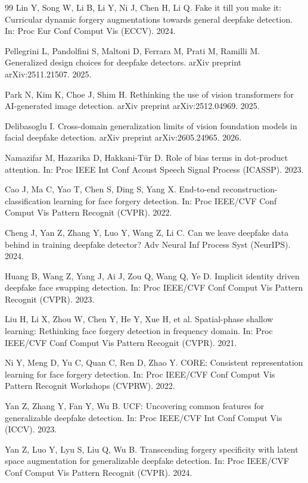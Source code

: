 \documentclass[fonts]{icst}
\begin{document}
\begin{thebibliography}{99}
Lin Y, Song W, Li B, Li Y, Ni J, Chen H, Li Q.
Fake it till you make it: Curricular dynamic forgery augmentations towards general deepfake detection.
In: Proc Eur Conf Comput Vis (ECCV). 2024.

Pellegrini L, Pandolfini S, Maltoni D, Ferrara M, Prati M, Ramilli M.
Generalized design choices for deepfake detectors.
arXiv preprint arXiv:2511.21507. 2025.

Park N, Kim K, Choe J, Shim H.
Rethinking the use of vision transformers for AI-generated image detection.
arXiv preprint arXiv:2512.04969. 2025.

Delibasoglu I.
Cross-domain generalization limits of vision foundation models in facial deepfake detection.
arXiv preprint arXiv:2605.24965. 2026.

Namazifar M, Hazarika D, Hakkani-T{\"u}r D.
Role of bias terms in dot-product attention.
In: Proc IEEE Int Conf Acoust Speech Signal Process (ICASSP). 2023.

Cao J, Ma C, Yao T, Chen S, Ding S, Yang X.
End-to-end reconstruction-classification learning for face forgery detection.
In: Proc IEEE/CVF Conf Comput Vis Pattern Recognit (CVPR). 2022.

Cheng J, Yan Z, Zhang Y, Luo Y, Wang Z, Li C.
Can we leave deepfake data behind in training deepfake detector?
Adv Neural Inf Process Syst (NeurIPS). 2024.

Huang B, Wang Z, Yang J, Ai J, Zou Q, Wang Q, Ye D.
Implicit identity driven deepfake face swapping detection.
In: Proc IEEE/CVF Conf Comput Vis Pattern Recognit (CVPR). 2023.

Liu H, Li X, Zhou W, Chen Y, He Y, Xue H, et al.
Spatial-phase shallow learning: Rethinking face forgery detection in frequency domain.
In: Proc IEEE/CVF Conf Comput Vis Pattern Recognit (CVPR). 2021.

Ni Y, Meng D, Yu C, Quan C, Ren D, Zhao Y.
CORE: Consistent representation learning for face forgery detection.
In: Proc IEEE/CVF Conf Comput Vis Pattern Recognit Workshops (CVPRW). 2022.

Yan Z, Zhang Y, Fan Y, Wu B.
UCF: Uncovering common features for generalizable deepfake detection.
In: Proc IEEE/CVF Int Conf Comput Vis (ICCV). 2023.

Yan Z, Luo Y, Lyu S, Liu Q, Wu B.
Transcending forgery specificity with latent space augmentation for generalizable deepfake detection.
In: Proc IEEE/CVF Conf Comput Vis Pattern Recognit (CVPR). 2024.

\end{thebibliography}
\end{document}
